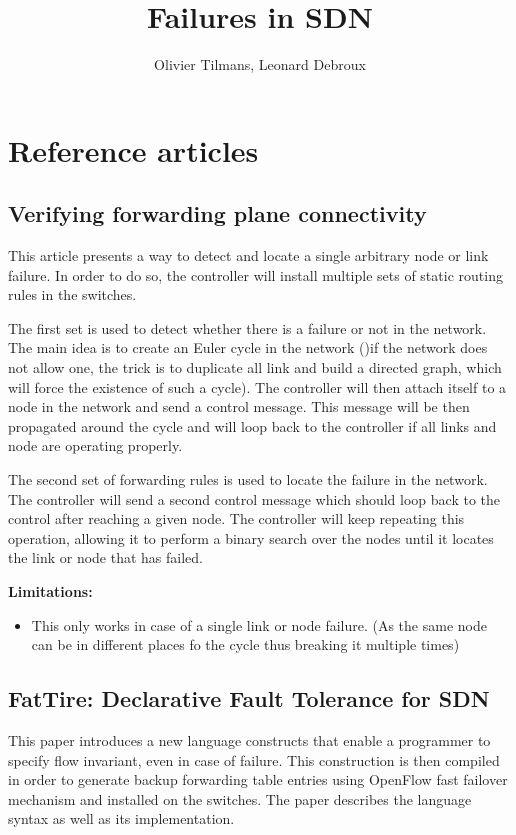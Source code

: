 \documentclass[11pt,a4paper]{article}
\author{Olivier Tilmans, Leonard Debroux}
\title{Failures in SDN}
\begin{document}
\maketitle
\section{Reference articles}
\subsection{Verifying forwarding plane connectivity}
This article presents a way to detect and locate a single arbitrary node or link failure.
In order to do so, the controller will install multiple sets of static routing rules in the switches.

The first set is used to detect whether there is a failure or not in the network.
The main idea is to create an Euler cycle in the network ()if the network does not allow one, the trick is to duplicate all link and build a directed graph, which will force the existence of such a cycle). The controller will then attach itself to a node in the network and send a control message. This message will be then propagated around the cycle and will loop back to the controller if all links and node are operating properly.

The second set of forwarding rules is used to locate the failure in the network. The controller will send a second control message which should loop back to the control after reaching a given node. The controller will keep repeating this operation, allowing it to perform a binary search over the nodes until it locates the link or node that has failed.

\textbf{Limitations:}
\begin{itemize}
	\item This only works in case of a single link or node failure. (As the same node can be in different places fo the cycle thus breaking it multiple times)
\end{itemize}

\subsection{FatTire: Declarative Fault Tolerance for SDN}
This paper introduces a new language constructs that enable a programmer to specify flow invariant, even in case of failure. This construction is then compiled in order to generate backup forwarding table entries using OpenFlow fast failover mechanism and installed on the switches.
The paper describes the language syntax as well as its implementation.
\end{document}
